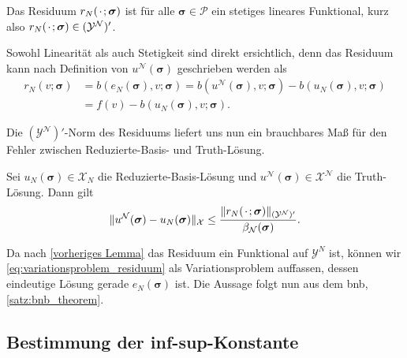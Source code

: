 \documentclass[../main.tex]{subfiles}
\begin{document}
\begin{Lemma}
    Das Residuum $r_{N}({\mkern2mu\cdot\mkern2mu}; \bm \sigma)$ ist für alle $\bm \sigma \in \mathcal P$ ein stetiges lineares Funktional, kurz also $r_{N}({\mkern2mu\cdot\mkern2mu}; \bm \sigma) \in \mathcal (\mathcal Y^{\mathcal N})'$.

    \begin{Beweis}
        Sowohl Linearität als auch Stetigkeit sind direkt ersichtlich, denn das Residuum kann nach Definition von $u^{\mathcal N}(\bm \sigma)$ geschrieben werden als
        \begin{equation}
            \begin{aligned}
            r_{N}(v; \bm \sigma)
            &= b(e_{N}(\bm \sigma), v; \bm \sigma)
            = b(u^{\mathcal N}(\bm \sigma), v; \bm \sigma) - b(u_{N}(\bm \sigma), v; \bm \sigma)
            \\&= f(v) - b(u_{N}(\bm \sigma), v; \bm \sigma).
            \end{aligned}
        \end{equation}
    \end{Beweis}
\end{Lemma}

Die $(\mathcal Y^{\mathcal N})'$-Norm des Residuums liefert uns nun ein brauchbares Maß für den Fehler zwischen Reduzierte-Basis- und Truth-Lösung.

\begin{Lemma}
    Sei $u_{N}(\bm \sigma) \in \mathcal X_{N}$ die Reduzierte-Basis-Lösung und $u^{\mathcal N}(\bm \sigma) \in \mathcal X^{\mathcal N}$ die Truth-Lösung.
    Dann gilt
    \begin{equation}
        \lVert u^{\mathcal N}(\bm \sigma) - u_{N}(\bm \sigma)\rVert_{\mathcal X} \leq \frac{\lVert r_{N}({\mkern2mu\cdot\mkern2mu}; \bm \sigma)\rVert_{(\mathcal Y^{\mathcal N})'}}{\beta_{\mathcal N}(\bm \sigma)}.
    \end{equation}

    \begin{Beweis}
        Da nach \cref{vorheriges Lemma} das Residuum ein Funktional auf $\mathcal Y^{N}$ ist, können wir \cref{eq:variationsproblem_residuum} als Variationsproblem auffassen, dessen eindeutige Lösung gerade $e_{N}(\bm \sigma)$ ist.
        Die Aussage folgt nun aus dem \acl{bnb}, \cref{satz:bnb_theorem}.
    \end{Beweis}
\end{Lemma}


\subsection{Bestimmung der inf-sup-Konstante} %
\label{sub:bestimmung_der_inf_sup_konstante}
\end{document}
